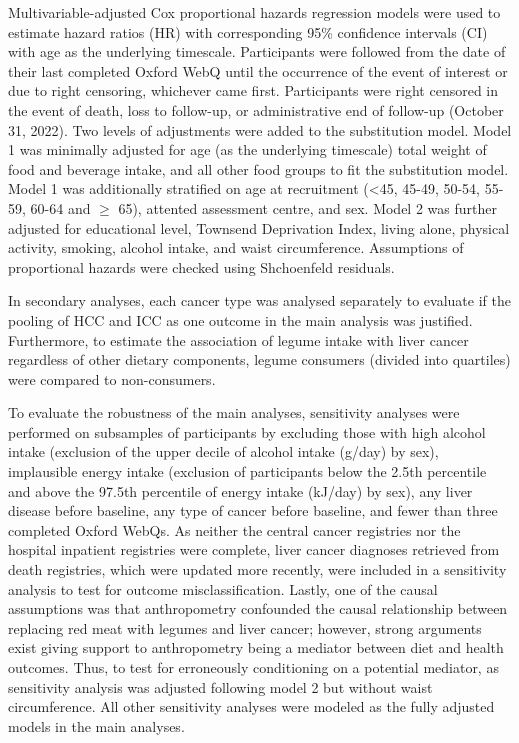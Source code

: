 \documentclass[nutrients,article,submit,moreauthors,pdftex]{Definitions/mdpi}
\begin{document}
Multivariable-adjusted Cox proportional hazards regression models were
used to estimate hazard ratios (HR) with corresponding 95\% confidence
intervals (CI) with age as the underlying timescale. Participants were
followed from the date of their last completed Oxford WebQ until the
occurrence of the event of interest or due to right censoring, whichever
came first. Participants were right censored in the event of death, loss
to follow-up, or administrative end of follow-up (October 31, 2022). Two
levels of adjustments were added to the substitution model. Model 1 was
minimally adjusted for age (as the underlying timescale) total weight of
food and beverage intake, and all other food groups to fit the
substitution model. Model 1 was additionally stratified on age at
recruitment (\textless45, 45-49, 50-54, 55-59, 60-64 and \(\geq\) 65), attented
assessment centre, and sex. Model 2 was further adjusted for educational
level, Townsend Deprivation Index, living alone, physical activity,
smoking, alcohol intake, and waist circumference. Assumptions of
proportional hazards were checked using Shchoenfeld residuals.

In secondary analyses, each cancer type was analysed separately to
evaluate if the pooling of HCC and ICC as one outcome in the main
analysis was justified. Furthermore, to estimate the association of
legume intake with liver cancer regardless of other dietary components,
legume consumers (divided into quartiles) were compared to
non-consumers.

To evaluate the robustness of the main analyses, sensitivity analyses
were performed on subsamples of participants by excluding those with
high alcohol intake (exclusion of the upper decile of alcohol intake
(g/day) by sex), implausible energy intake (exclusion of participants
below the 2.5th percentile and above the 97.5th percentile of energy
intake (kJ/day) by sex), any liver disease before baseline, any type of
cancer before baseline, and fewer than three completed Oxford WebQs. As
neither the central cancer registries nor the hospital inpatient
registries were complete, liver cancer diagnoses retrieved from death
registries, which were updated more recently, were included in a
sensitivity analysis to test for outcome misclassification. Lastly, one
of the causal assumptions was that anthropometry confounded the causal
relationship between replacing red meat with legumes and liver cancer;
however, strong arguments exist giving support to anthropometry being a
mediator between diet and health outcomes. Thus, to test for erroneously
conditioning on a potential mediator, as sensitivity analysis was
adjusted following model 2 but without waist circumference. All other
sensitivity analyses were modeled as the fully adjusted models in the
main analyses.
\end{document}
